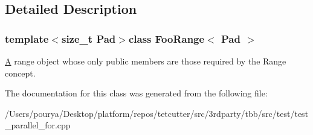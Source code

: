 \subsection{Detailed Description}
\subsubsection*{template$<$size\+\_\+t Pad$>$class Foo\+Range$<$ Pad $>$}

\hyperlink{structA}{A} range object whose only public members are those required by the Range concept. 

The documentation for this class was generated from the following file\+:\begin{DoxyCompactItemize}
\item 
/\+Users/pourya/\+Desktop/platform/repos/tetcutter/src/3rdparty/tbb/src/test/test\+\_\+parallel\+\_\+for.\+cpp\end{DoxyCompactItemize}
